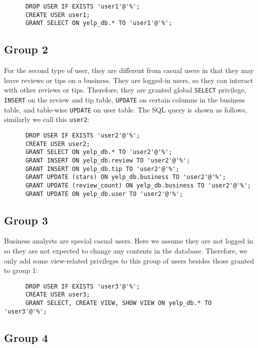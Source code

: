 \documentclass[12pt]{scrbook}
\begin{document}
    \begin{verbatim}
      DROP USER IF EXISTS 'user1'@'%';
      CREATE USER user1;
      GRANT SELECT ON yelp_db.* TO 'user1'@'%';
    \end{verbatim}
  
\subsection{Group 2}

    For the second type of user, they are different from casual users in that they may leave reviews
	or tips on a business. They are logged-in users, so they can interact with other reviews or tips.
	Therefore, they are granted global \texttt{SELECT} privilege, \texttt{INSERT} on the review and
	tip table, \texttt{UPDATE} on certain columns in the business table, and table-wise \texttt{UPDATE}
	on user table. The SQL query is shown as follows, similarly we call this \texttt{user2}:

    \begin{verbatim}
      DROP USER IF EXISTS 'user2'@'%';
      CREATE USER user2;
      GRANT SELECT ON yelp_db.* TO 'user2'@'%';
      GRANT INSERT ON yelp_db.review TO 'user2'@'%';
      GRANT INSERT ON yelp_db.tip TO 'user2'@'%';
      GRANT UPDATE (stars) ON yelp_db.business TO 'user2'@'%';
      GRANT UPDATE (review_count) ON yelp_db.business TO 'user2'@'%';
      GRANT UPDATE ON yelp_db.user TO 'user2'@'%';
    \end{verbatim}

\subsection{Group 3}

    Business analysts are special casual users. Here we assume they are not logged in so they are
	not expected to change any contents in the database. Therefore, we only add some view-related
	privileges to this group of users besides those granted to group 1:

    \begin{verbatim}
      DROP USER IF EXISTS 'user3'@'%';
      CREATE USER user3;
      GRANT SELECT, CREATE VIEW, SHOW VIEW ON yelp_db.* TO 'user3'@'%';
    \end{verbatim}

\subsection{Group 4}
\end{document}
